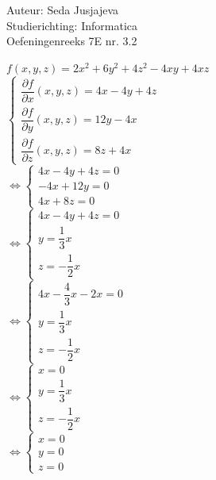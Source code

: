 \documentclass[a4paper]{article}
\begin{document}
\noindent \large Auteur: Seda Jusjajeva\\
\noindent \large Studierichting: Informatica\\
\noindent \large Oefeningenreeks 7E nr. 3.2\\

\medskip

\normalsize




$f(x, y, z) = 2x^2 + 6y^2 + 4z^2 - 4xy + 4xz$ \\

$\left\{\begin{array}{l}
	\dfrac{\partial f}{\partial x}(x, y, z) = 4x - 4y + 4z \\
	\dfrac{\partial f}{\partial y}(x, y, z) = 12y - 4x     \\
	\dfrac{\partial f}{\partial z}(x, y, z) = 8z + 4x
\end{array}\right.$ \\

$\Leftrightarrow\left\{\begin{array}{l}
	4x - 4y + 4z = 0 \\
	-4x + 12y = 0    \\
	4x + 8z = 0
\end{array}\right.$ \\

$\Leftrightarrow\left\{\begin{array}{l}
	4x - 4y + 4z = 0 \\
	y = \dfrac{1}{3}x    \\
	z = -\dfrac{1}{2}x
\end{array}\right.$ \\

$\Leftrightarrow\left\{\begin{array}{l}
	4x - \dfrac{4}{3}x - 2x = 0 \\
	y = \dfrac{1}{3}x    \\
	z = -\dfrac{1}{2}x
\end{array}\right.$ \\

$\Leftrightarrow\left\{\begin{array}{l}
	x = 0 \\
	y = \dfrac{1}{3}x    \\
	z = -\dfrac{1}{2}x
\end{array}\right.$ \\

$\Leftrightarrow\left\{\begin{array}{l}
	x = 0 \\
	y = 0 \\
	z = 0
\end{array}\right.$ \\
\end{document}

